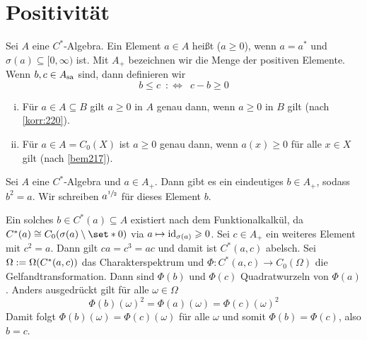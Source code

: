\section{Positivität} %
\label{sec:3}

\begin{definition}[{name=[Positivität]}]
	Sei $A$ eine $C^*$-Algebra. Ein Element $a \in A$ heißt  ($a \ge 0$), wenn $a=a^*$ und $\sigma(a) \subseteq [0,\infty)$ ist. Mit $A_+$ bezeichnen wir die 
	Menge der positiven Elemente. Wenn $b,c \in A_{\mathrm{sa}}$ sind, dann definieren wir 
	\[
		b \le c \enspace :\Longleftrightarrow \enspace c-b \ge 0
	\]
\end{definition}

\begin{bemerkung}[{name=[positive Elemente in Unteralgebren und in $C_0(X)$]},label=bem:32] \leavevmode
	\begin{enumerate}[(i),itemsep=2pt]
		\item Für $a \in A \subseteq B$ gilt $a \ge 0$ in $A$ genau dann, wenn $a \ge 0$ in $B$ gilt (nach \autoref{korr:220}).
		\item Für $a \in A = C_0(X)$ ist $a \ge 0$ genau dann, wenn $a(x) \ge 0$ für alle $x \in X$ gilt (nach \ref{bem217}).
	\end{enumerate}
\end{bemerkung}

\begin{proposition}[label=prop:33,{name=[Existenz von Quadratwurzeln]}]
	Sei $A$ eine $C^*$-Algebra und $a \in A_+$. Dann gibt es ein eindeutiges $b \in  A_+$, sodass $b^2=a$. Wir schreiben $a^{\sfrac{1}{2}}$ für dieses Element $b$.
\end{proposition}
\begin{beweis}
	Ein solches $b \in C^*(a) \subseteq A$ existiert nach dem Funktionalkalkül, da $C^*(a) \cong C_0 \enbrace*{\sigma(a) \setminus \set*{0}}$ via $a \mapsto \operatorname{id}_{\sigma(a)} \geqslant 0$.
	Sei $c \in A_+$ ein weiteres Element mit $c^2=a$. Dann gilt $ca=c^3=ac$ und damit ist $C^*(a,c)$ abelsch. 
	Sei $\Omega := \Omega \enbrace*{C^*(a,c)}$ das Charakterspektrum und $\Phi \colon C^*(a,c) \to C_0(\Omega)$ die Gelfandtransformation. 
	Dann sind $\Phi(b)$ und $\Phi(c)$ Quadratwurzeln von $\Phi(a)$. 
	Anders ausgedrückt gilt für alle $\omega \in \Omega$
	\[
		\Phi(b)(\omega)^2 = \Phi(a)(\omega) = \Phi(c)(\omega)^2
	\]
	Damit folgt $\Phi(b)(\omega)=\Phi(c)(\omega)$ für alle $\omega$ und somit $\Phi(b)=\Phi(c)$, also $b=c$.
\end{beweis}

